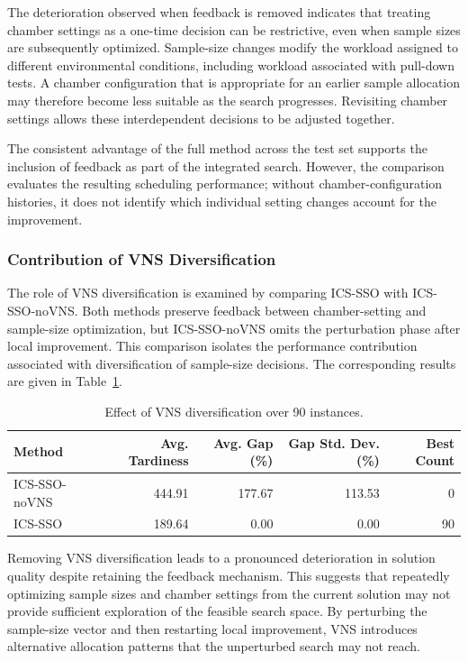\documentclass[11pt]{article}
\begin{document}
The deterioration observed when feedback is removed indicates that treating chamber settings as a one-time decision can be restrictive, even when sample sizes are subsequently optimized. Sample-size changes modify the workload assigned to different environmental conditions, including workload associated with pull-down tests. A chamber configuration that is appropriate for an earlier sample allocation may therefore become less suitable as the search progresses. Revisiting chamber settings allows these interdependent decisions to be adjusted together.

The consistent advantage of the full method across the test set supports the inclusion of feedback as part of the integrated search. However, the comparison evaluates the resulting scheduling performance; without chamber-configuration histories, it does not identify which individual setting changes account for the improvement.

\subsubsection{Contribution of VNS Diversification}
\label{subsubsec:vns_contribution}

The role of VNS diversification is examined by comparing ICS-SSO with ICS-SSO-noVNS. Both methods preserve feedback between chamber-setting and sample-size optimization, but ICS-SSO-noVNS omits the perturbation phase after local improvement. This comparison isolates the performance contribution associated with diversification of sample-size decisions. The corresponding results are given in Table~\ref{tab:diversification_comparison}.

\begin{table}[H]
\centering
\caption{Effect of VNS diversification over 90 instances.}
\label{tab:diversification_comparison}
\footnotesize
\setlength{\tabcolsep}{4pt}
\begin{tabular}{lrrrr}
\hline
\textbf{Method} & \textbf{Avg. Tardiness} & \textbf{Avg. Gap (\%)} & \textbf{Gap Std. Dev. (\%)} & \textbf{Best Count} \\
\hline
ICS-SSO-noVNS & 444.91 & 177.67 & 113.53 & 0 \\
ICS-SSO & 189.64 & 0.00 & 0.00 & 90 \\
\hline
\end{tabular}
\end{table}

Removing VNS diversification leads to a pronounced deterioration in solution quality despite retaining the feedback mechanism. This suggests that repeatedly optimizing sample sizes and chamber settings from the current solution may not provide sufficient exploration of the feasible search space. By perturbing the sample-size vector and then restarting local improvement, VNS introduces alternative allocation patterns that the unperturbed search may not reach.
\end{document}
